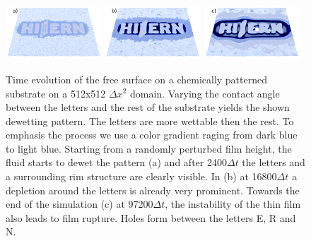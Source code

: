 \begin{figure}
    \centering
    \includegraphics[width=0.32\textwidth]{graphics/Fig_8_1_logo_v2_a).png}
    \includegraphics[width=0.32\textwidth]{graphics/Fig_8_2_logo_v2_b).png}
    \includegraphics[width=0.32\textwidth]{graphics/Fig_8_3_logo_v2_c).png}
  \caption{Time evolution of the free surface on a chemically patterned substrate on a 512x512 $\Delta x^2$ domain. Varying the contact angle between the letters and the rest of the substrate yields the shown dewetting pattern. The letters are more wettable then the rest. To emphasis the process we use a color gradient raging from dark blue to light blue.
  Starting from a randomly perturbed film height, the fluid starts to dewet the pattern (a) and after 2400$\Delta t$ the letters and a surrounding rim structure are clearly visible. In (b) at 16800$\Delta t$ a depletion around the letters is already very prominent. Towards the end of the simulation (c) at 97200$\Delta t$, the instability of the thin film also leads to film rupture. Holes form between the letters E, R and N.  
  }
  \label{fig:Logo_evolution}
\end{figure}

